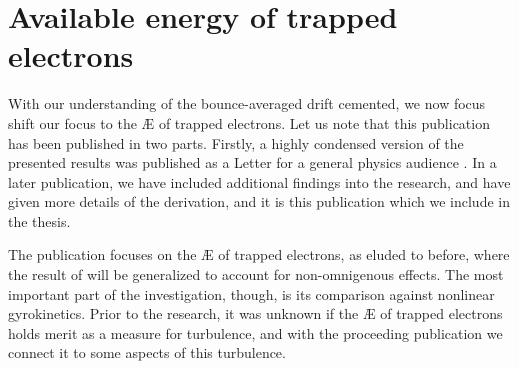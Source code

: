 \chapter[Available energy of trapped electrons]{Available energy of trapped electrons}
\label{chap: AE-TE}
With our understanding of the bounce-averaged drift cemented, we now focus shift our focus to the \AE{} of trapped electrons. Let us note that this publication has been published in two parts. Firstly, a highly condensed version of the presented results was published as a Letter for a general physics audience \cite{mackenbach2022available}. In a later publication, we have included additional findings into the research, and have given more details of the derivation, and it is this publication which we include in the thesis. \par 
The publication focuses on the \AE{} of trapped electrons, as eluded to before, where the result of \cite{helander2020available} will be generalized to account for non-omnigenous effects. The most important part of the investigation, though, is its comparison against nonlinear gyrokinetics. Prior to the research, it was unknown if the \AE{} of trapped electrons holds merit as a measure for turbulence, and with the proceeding publication we connect it to some aspects of this turbulence. \vfill \newpage
